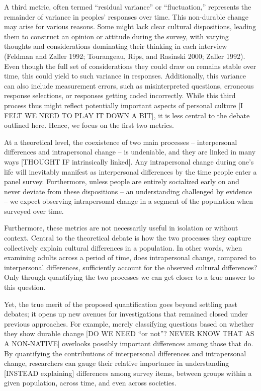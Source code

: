 \documentclass[
  11pt,
]{article}
\begin{document}
A third metric, often termed ``residual variance'' or ``fluctuation,''
represents the remainder of variance in peoples' responses over time.
This non-durable change may arise for various reasons. Some might lack
clear cultural dispositions, leading them to construct an opinion or
attitude during the survey, with varying thoughts and considerations
dominating their thinking in each interview (Feldman and Zaller 1992;
Tourangeau, Rips, and Rasinski 2000; Zaller 1992). Even though the full
set of considerations they could draw on remains stable over time, this
could yield to such variance in responses. Additionally, this variance
can also include measurement errors, such as misinterpreted questions,
erroneous response selections, or responses getting coded incorrectly.
While this third process thus might reflect potentially important
aspects of personal culture {[}I FELT WE NEED TO PLAY IT DOWN A BIT{]},
it is less central to the debate outlined here. Hence, we focus on the
first two metrics.

At a theoretical level, the coexistence of two main processes --
interpersonal differences and intrapersonal change -- is undeniable, and
they are linked in many ways {[}THOUGHT IF intrinsically linked{]}. Any
intrapersonal change during one's life will inevitably manifest as
interpersonal differences by the time people enter a panel survey.
Furthermore, unless people are entirely socialized early on and never
deviate from these dispositions -- an understanding challenged by
evidence -- we expect observing intrapersonal change in a segment of the
population when surveyed over time.

Furthermore, these metrics are not necessarily useful in isolation or
without context. Central to the theoretical debate is how the two
processes they capture collectively explain cultural differences in a
population. In other words, when examining adults across a period of
time, does intrapersonal change, compared to interpersonal differences,
sufficiently account for the observed cultural differences? Only through
quantifying the two processes we can get closer to a true answer to this
question.

Yet, the true merit of the proposed quantification goes beyond settling
past debates; it opens up new avenues for investigations that remained
closed under previous approaches. For example, merely classifying
questions based on whether they show durable change {[}DO WE NEED ``or
not''? NEVER KNOW THAT AS A NON-NATIVE{]} overlooks possibly important
differences among those that do. By quantifying the contributions of
interpersonal differences and intrapersonal change, researchers can
gauge their relative importance in understanding {[}INSTEAD
explaining{]} differences among survey items, between groups within a
given population, across time, and even across societies.
\end{document}
